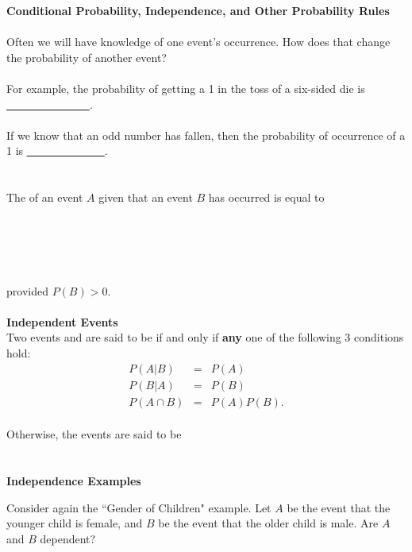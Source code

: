 \newpage

\huge\textbf{Conditional Probability, Independence, and Other Probability Rules}\normalsize\\~\\
Often we will have knowledge of one event's occurrence.  How does that change the probability of another event?\\~\\

For example, the probability of getting a 1 in the toss of a six-sided die is \underline{~~~~~~~~~~~~~~~}.\\~\\
If we know that an odd number has fallen, then the probability of occurrence of a 1 is \underline{~~~~~~~~~~~~~~}.\\~\\~\\
The \underbar{~~~~~~~~~~~~~~~~~~~~~~~~~~~~~~~~~~~~~~~~~~~~~~~~~~~} of an event $A$ given that an event $B$ has occurred is equal to\\~\\~\\~\\~\\~\\
provided $P(B)>0$.\\~\\

\textbf{Independent Events}\\ 
Two events and are said to be \underbar{~~~~~~~~~~~~~~~~~~~~~~~~~~~~~~~~~~~~~~} if and only if \textbf{any} one of the following 3 conditions hold:
\begin{eqnarray*}
P(A|B) &=& P(A)\\
P(B|A) &=& P(B)\\
P(A \cap B) &=& P(A)P(B).
\end{eqnarray*}
~\\Otherwise, the events are said to be \underbar{~~~~~~~~~~~~~~~~~~~~~~~~~~~~~~~~~~~~~~~~~~~~~~~~~~~~~}\\~\\~\\


\textbf{Independence Examples}
\bi
\item Consider again the ``Gender of Children" example.  Let $A$ be the event that the younger child is female, and $B$ be the event that the older child is male.  Are $A$ and $B$ dependent?

\newpage

